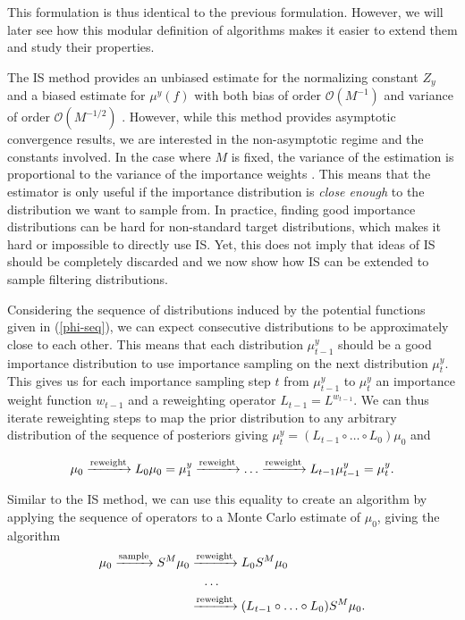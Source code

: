 This formulation is thus identical to the previous formulation. However, we will later see how this modular definition of algorithms makes it easier to extend them and study their properties.

The IS method provides an unbiased estimate for the normalizing constant $Z_y$ and a biased estimate for $\mu^y(f)$ with both bias of order $\mathcal{O}(M^{-1})$ and variance of order $\mathcal{O}(M^{-1/2})$ \cite{agapiou2017importance}. However, while this method provides asymptotic convergence results, we are interested in the non-asymptotic regime and the constants involved. In the case where $M$ is fixed, the variance of the estimation is proportional to the variance of the importance weights \cite{agapiou2017importance}. This means that the estimator is only useful if the importance distribution is \textit{close enough} to the distribution we want to sample from. In practice, finding good importance distributions can be hard for non-standard target distributions, which makes it hard or impossible to directly use IS. Yet, this does not imply that ideas of IS should be completely discarded and we now show how IS can be extended to sample filtering distributions.

Considering the sequence of distributions induced by the potential functions given in (\ref{phi-seq}), we can expect consecutive distributions to be approximately close to each other. This means that each distribution $\mu^y_{t-1}$ should be a good importance distribution to use importance sampling on the next distribution $\mu^y_t$. This gives us for each importance sampling step $t$ from $\mu^y_{t-1}$ to $\mu^y_t$ an importance weight function $w_{t-1}$ and a reweighting operator $L_{t-1} = L^{w_{t-1}}$. We can thus iterate reweighting steps to map the prior distribution to any arbitrary distribution of the sequence of posteriors giving $\mu^y_t = (L_{t-1} \circ \ldots \circ L_0) \mu_0$ and

\begin{equation*}
  \mu_0 \xrightarrow{\text{reweight}} L_0\mu_0 = \mu^y_1 \xrightarrow{\text{reweight}} \ldots\xrightarrow{\text{reweight}} L_{t-1}\mu^y_{t-1} = \mu^y_t.
\end{equation*}

Similar to the IS method, we can use this equality to create an algorithm by applying the sequence of operators to a Monte Carlo estimate of $\mu_0$, giving the algorithm
\begin{align*}
  \mu_0 \xrightarrow{\text{sample}} S^M\mu_0
  &\xrightarrow{\text{reweight}} L_0S^M\mu_0\\
  &\ \ \ \ldots\\
  &\xrightarrow{\text{reweight}} (L_{t-1} \circ \ldots \circ L_0)S^M\mu_0.
\end{align*}

